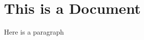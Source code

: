\documentclass[11pt]{article}
\begin{document}
\section{This is a Document}

Here is a paragraph
\end{document}
